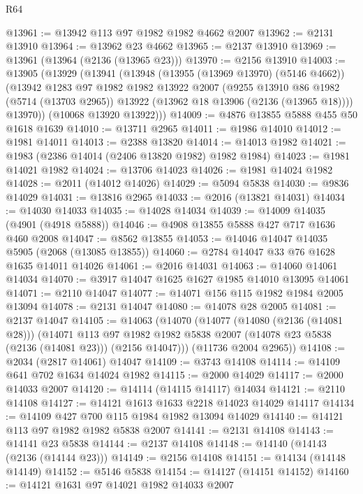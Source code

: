 \begin{lexlean}{R64}
\begin{coremodule}
@13961 := @13942 @113 @97 @1982 @1982 @4662 @2007
@13962 := @2131 @13910
@13964 := @13962 @23 @4662
@13965 := @2137 @13910
@13969 := @13961 (@13964 (@2136 (@13965 @23)))
@13970 := @2156 @13910
@14003 := @13905
    (@13929
      (@13941
        (@13948
          (@13955 (@13969 @13970) (@5146 @4662))
          (@13942
            @1283
            @97
            @1982
            @1982
            @13922
            @2007
            (@9255
              @13910
              @86
              @1982
              (@5714 (@13703 @2965))
              @13922
              (@13962 @18 @13906 (@2136 (@13965 @18))))
            @13970))
        (@10068 @13920 @13922)))
@14009 := @4876 @13855 @5888 @455 @50 @1618 @1639
@14010 := @13711 @2965
@14011 := @1986 @14010
@14012 := @1981 @14011
@14013 := @2388 @13820
@14014 := @14013 @1982
@14021 := @1983 (@2386 @14014 (@2406 @13820 @1982) @1982 @1984)
@14023 := @1981 @14021 @1982
@14024 := @13706 @14023
@14026 := @1981 @14024 @1982
@14028 := @2011 (@14012 @14026)
@14029 := @5094 @5838
@14030 := @9836 @14029
@14031 := @13816 @2965
@14033 := @2016 (@13821 @14031)
@14034 := @14030 @14033
@14035 := @14028 @14034
@14039 := @14009 @14035 (@4901 (@4918 @5888))
@14046 := @4908 @13855 @5888 @427 @717 @1636 @460 @2008
@14047 := @8562 @13855
@14053 := @14046 @14047 @14035 @5905 (@2068 (@13085 @13855))
@14060 := @2784 @14047 @33 @76 @1628 @1635 @14011 @14026
@14061 := @2016 @14031
@14063 := @14060 @14061 @14034
@14070 := @3917 @14047 @1625 @1627 @1985 @14010 @13095 @14061
@14071 := @2110 @14047
@14077 := @14071 @156 @115 @1982 @1984 @2005 @13094
@14078 := @2131 @14047
@14080 := @14078 @28 @2005
@14081 := @2137 @14047
@14105 := @14063
    (@14070
      (@14077
        (@14080 (@2136 (@14081 @28)))
        (@14071
          @113
          @97
          @1982
          @1982
          @5838
          @2007
          (@14078 @23 @5838 (@2136 (@14081 @23)))
          (@2156 @14047)))
      (@11736 @2004 @2965))
@14108 := @2034 (@2817 @14061) @14047
@14109 := @3743 @14108
@14114 := @14109 @641 @702 @1634 @14024 @1982
@14115 := @2000 @14029
@14117 := @2000 @14033 @2007
@14120 := @14114 (@14115 @14117) @14034
@14121 := @2110 @14108
@14127 := @14121 @1613 @1633 @2218 @14023 @14029 @14117
@14134 := @14109 @427 @700 @115 @1984 @1982 @13094 @14029
@14140 := @14121 @113 @97 @1982 @1982 @5838 @2007
@14141 := @2131 @14108
@14143 := @14141 @23 @5838
@14144 := @2137 @14108
@14148 := @14140 (@14143 (@2136 (@14144 @23)))
@14149 := @2156 @14108
@14151 := @14134 (@14148 @14149)
@14152 := @5146 @5838
@14154 := @14127 (@14151 @14152)
@14160 := @14121 @1631 @97 @14021 @1982 @14033 @2007

\end{coremodule}
\end{lexlean}
